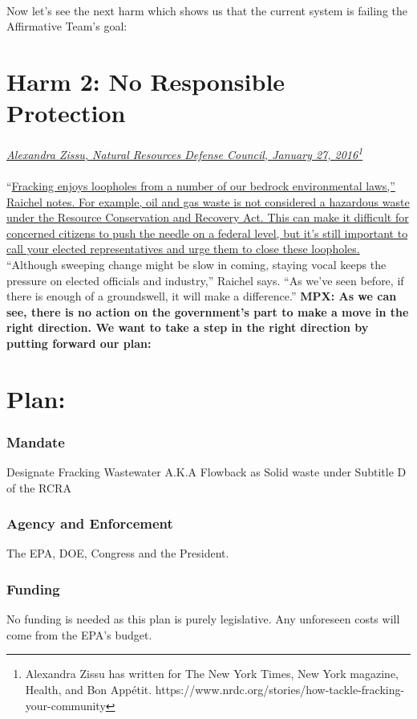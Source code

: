 \documentclass[11pt]{article}
\begin{document}
	\paragraph{}
	Now let’s see the next harm which shows us that the current system is failing the Affirmative Team’s goal:
	
	\section{Harm 2: No Responsible Protection}
	\textit{\ul{Alexandra Zissu, Natural Resources Defense Council, January 27, 2016}\footnote{Alexandra Zissu has written for The New York Times, New York magazine, Health, and Bon Appétit. https://www.nrdc.org/stories/how-tackle-fracking-your-community}}
	\paragraph{}
	``\ul{Fracking enjoys loopholes from a number of our bedrock environmental laws,'' Raichel notes. For example, oil and gas waste is not considered a hazardous waste under the Resource Conservation and Recovery Act. This can make it difficult for concerned citizens to push the needle on a federal level, but it’s still important to call your elected representatives and urge them to close these loopholes.} ``Although sweeping change might be slow in coming, staying vocal keeps the pressure on elected officials and industry,'' Raichel says. ``As we’ve seen before, if there is enough of a groundswell, it will make a difference.''\newline
	\textbf{MPX: As we can see, there is no action on the government’s part to make a move in the right direction. We want to take a step in the right direction by putting forward our plan:}
	
	\section{Plan:}
	\subsubsection{Mandate }
	Designate Fracking Wastewater A.K.A Flowback as Solid waste under Subtitle D of the RCRA
	\subsubsection{Agency and Enforcement }
	The EPA, DOE, Congress and the President.
	\subsubsection{Funding }
	No funding is needed as this plan is purely legislative. Any unforeseen costs will come from the EPA’s budget.
\end{document}
